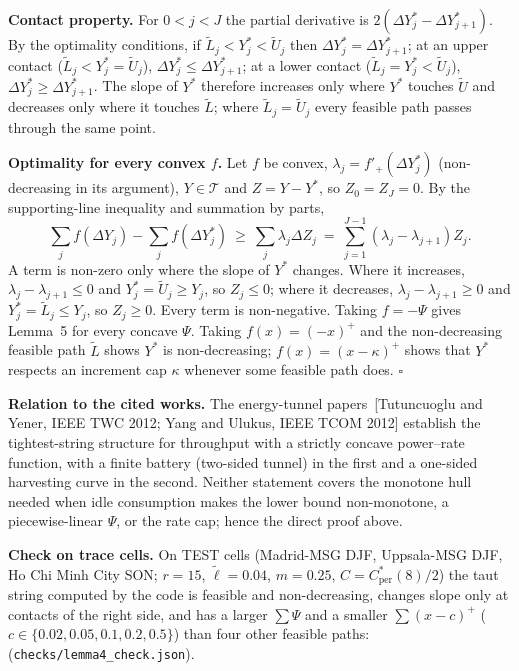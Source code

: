 \documentclass[10pt]{article}
\newcommand{\lt}{\tilde{\ell}}
\begin{document}
\textbf{Contact property.} For $0<j<J$ the partial derivative is $2(\Delta Y^*_j-\Delta Y^*_{j+1})$. By the optimality conditions, if $\tilde L_j<Y^*_j<\tilde U_j$ then $\Delta Y^*_j=\Delta Y^*_{j+1}$; at an upper contact ($\tilde L_j<Y^*_j=\tilde U_j$), $\Delta Y^*_j\le\Delta Y^*_{j+1}$; at a lower contact ($\tilde L_j=Y^*_j<\tilde U_j$), $\Delta Y^*_j\ge\Delta Y^*_{j+1}$. The slope of $Y^*$ therefore increases only where $Y^*$ touches $\tilde U$ and decreases only where it touches $\tilde L$; where $\tilde L_j=\tilde U_j$ every feasible path passes through the same point.

\textbf{Optimality for every convex $f$.} Let $f$ be convex, $\lambda_j=f'_+(\Delta Y^*_j)$ (non-decreasing in its argument), $Y\in\mathcal{T}$ and $Z=Y-Y^*$, so $Z_0=Z_J=0$. By the supporting-line inequality and summation by parts,
\[\sum_jf(\Delta Y_j)-\sum_jf(\Delta Y^*_j)\ \ge\ \sum_j\lambda_j\Delta Z_j\ =\ \sum_{j=1}^{J-1}(\lambda_j-\lambda_{j+1})Z_j .\]
A term is non-zero only where the slope of $Y^*$ changes. Where it increases, $\lambda_j-\lambda_{j+1}\le0$ and $Y^*_j=\tilde U_j\ge Y_j$, so $Z_j\le0$; where it decreases, $\lambda_j-\lambda_{j+1}\ge0$ and $Y^*_j=\tilde L_j\le Y_j$, so $Z_j\ge0$. Every term is non-negative. Taking $f=-\Psi$ gives Lemma~5 for every concave $\Psi$. Taking $f(x)=(-x)^+$ and the non-decreasing feasible path $\tilde L$ shows $Y^*$ is non-decreasing; $f(x)=(x-\kappa)^+$ shows that $Y^*$ respects an increment cap $\kappa$ whenever some feasible path does. $\square$

\textbf{Relation to the cited works.} The energy-tunnel papers~[Tutuncuoglu and Yener, IEEE TWC 2012; Yang and Ulukus, IEEE TCOM 2012] establish the tightest-string structure for throughput with a strictly concave power--rate function, with a finite battery (two-sided tunnel) in the first and a one-sided harvesting curve in the second. Neither statement covers the monotone hull needed when idle consumption makes the lower bound non-monotone, a piecewise-linear $\Psi$, or the rate cap; hence the direct proof above.

\textbf{Check on trace cells.} On \LfourN{} TEST cells (Madrid-MSG DJF, Uppsala-MSG DJF, Ho Chi Minh City SON; $r=15$, $\lt=0.04$, $m=0.25$, $C=C^*_{\mathrm{per}}(8)/2$) the taut string computed by the code is feasible and non-decreasing, changes slope only at contacts of the right side, and has a larger $\sum\Psi$ and a smaller $\sum(x-c)^+$ ($c\in\{0.02,0.05,0.1,0.2,0.5\}$) than four other feasible paths: \LfourOK{} (\texttt{checks/lemma4\_check.json}).
\end{document}
